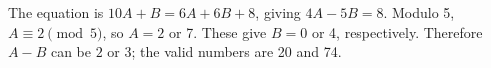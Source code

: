 The equation is $10A+B=6A+6B+8$, giving $4A-5B=8$. Modulo 5, $A\equiv2\pmod5$, so $A=2$ or 7. These give $B=0$ or 4, respectively. Therefore $A-B$ can be $\boxed2$ or $\boxed3$; the valid numbers are 20 and 74.
